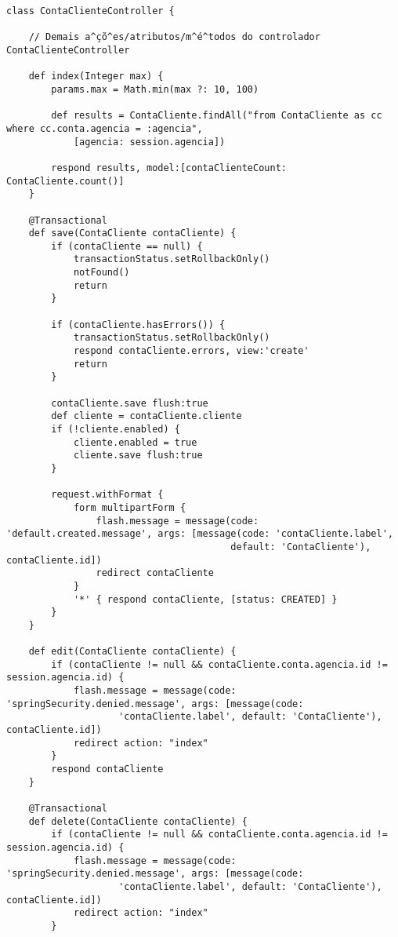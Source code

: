 \begin{lstlisting}[caption=Controlador {\bf ContaClienteController}, frame=trBL,
    float=htbp, label=codContaClienteController2] 
class ContaClienteController {

    // Demais a^çõ^es/atributos/m^é^todos do controlador ContaClienteController

    def index(Integer max) {
        params.max = Math.min(max ?: 10, 100)
		
        def results = ContaCliente.findAll("from ContaCliente as cc where cc.conta.agencia = :agencia",
            [agencia: session.agencia])
		
        respond results, model:[contaClienteCount: ContaCliente.count()]
    }

    @Transactional
    def save(ContaCliente contaCliente) {
        if (contaCliente == null) {
            transactionStatus.setRollbackOnly()
            notFound()
            return
        }

        if (contaCliente.hasErrors()) {
            transactionStatus.setRollbackOnly()
            respond contaCliente.errors, view:'create'
            return
        }

        contaCliente.save flush:true
        def cliente = contaCliente.cliente
        if (!cliente.enabled) {
            cliente.enabled = true
            cliente.save flush:true
        }

        request.withFormat {
            form multipartForm {
                flash.message = message(code: 'default.created.message', args: [message(code: 'contaCliente.label', 
                                        default: 'ContaCliente'), contaCliente.id])
                redirect contaCliente
            }
            '*' { respond contaCliente, [status: CREATED] }
        }
    }

    def edit(ContaCliente contaCliente) {
        if (contaCliente != null && contaCliente.conta.agencia.id != session.agencia.id) {
            flash.message = message(code: 'springSecurity.denied.message', args: [message(code:
                    'contaCliente.label', default: 'ContaCliente'), contaCliente.id])
            redirect action: "index"
        }
        respond contaCliente
    }

    @Transactional
    def delete(ContaCliente contaCliente) {
        if (contaCliente != null && contaCliente.conta.agencia.id != session.agencia.id) {
            flash.message = message(code: 'springSecurity.denied.message', args: [message(code:
                    'contaCliente.label', default: 'ContaCliente'), contaCliente.id])
            redirect action: "index"
        }


\end{lstlisting}
